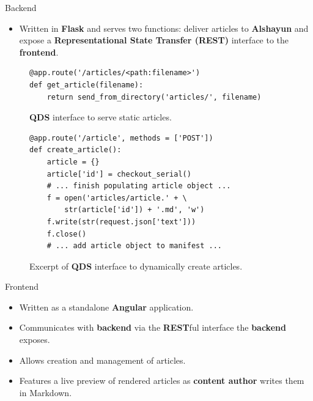 \documentclass{beamer}
\begin{document}
\begin{frame}{Backend}
    \begin{itemize}
        \item Written in \textbf{Flask} and serves two functions: deliver
            articles to \textbf{Alshayun} and expose a \textbf{Representational
            State Transfer (REST)} interface to the \textbf{frontend}.
    \end{itemize}
    \begin{figure}
    \begin{verbatim}
@app.route('/articles/<path:filename>')
def get_article(filename):
    return send_from_directory('articles/', filename)
    \end{verbatim}
    \caption{\textbf{QDS} interface to serve static articles.}
    \end{figure}
    \begin{figure}
    \begin{verbatim}
@app.route('/article', methods = ['POST'])
def create_article():
    article = {}
    article['id'] = checkout_serial()
    # ... finish populating article object ...
    f = open('articles/article.' + \
        str(article['id']) + '.md', 'w')
    f.write(str(request.json['text']))
    f.close()
    # ... add article object to manifest ...
    \end{verbatim}
    \caption{Excerpt of \textbf{QDS} interface to dynamically create articles.}
    \end{figure}
\end{frame}

\begin{frame}{Frontend}
    \begin{itemize}
        \item Written as a standalone \textbf{Angular} application.
        \item Communicates with \textbf{backend} via the \textbf{REST}ful
            interface the \textbf{backend} exposes.
        \item Allows creation and management of articles.
        \item Features a live preview of rendered articles as \textbf{content
            author} writes them in Markdown.
    \end{itemize}
\end{frame}
\end{document}
